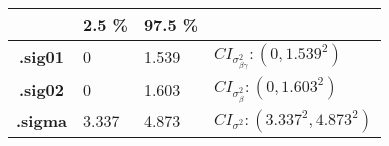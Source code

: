 \documentclass[12pt,]{article}
\begin{document}
\begin{longtable}[]{@{}clll@{}}
\toprule
\begin{minipage}[b]{0.21\columnwidth}\centering
~\strut
\end{minipage} & \begin{minipage}[b]{0.10\columnwidth}\raggedright
2.5 \%\strut
\end{minipage} & \begin{minipage}[b]{0.09\columnwidth}\raggedright
97.5 \%\strut
\end{minipage} & \begin{minipage}[b]{0.48\columnwidth}\raggedright
\strut
\end{minipage}\tabularnewline
\midrule
\endhead
\begin{minipage}[t]{0.21\columnwidth}\centering
\textbf{.sig01}\strut
\end{minipage} & \begin{minipage}[t]{0.10\columnwidth}\raggedright
0\strut
\end{minipage} & \begin{minipage}[t]{0.09\columnwidth}\raggedright
1.539\strut
\end{minipage} & \begin{minipage}[t]{0.48\columnwidth}\raggedright
\(CI_{\sigma^2_{\beta\gamma}}:(0,1.539^2)\)\strut
\end{minipage}\tabularnewline
\begin{minipage}[t]{0.21\columnwidth}\centering
\textbf{.sig02}\strut
\end{minipage} & \begin{minipage}[t]{0.10\columnwidth}\raggedright
0\strut
\end{minipage} & \begin{minipage}[t]{0.09\columnwidth}\raggedright
1.603\strut
\end{minipage} & \begin{minipage}[t]{0.48\columnwidth}\raggedright
\(CI_{\sigma^2_{\beta}}:(0,1.603^2)\)\strut
\end{minipage}\tabularnewline
\begin{minipage}[t]{0.21\columnwidth}\centering
\textbf{.sigma}\strut
\end{minipage} & \begin{minipage}[t]{0.10\columnwidth}\raggedright
3.337\strut
\end{minipage} & \begin{minipage}[t]{0.09\columnwidth}\raggedright
4.873\strut
\end{minipage} & \begin{minipage}[t]{0.48\columnwidth}\raggedright
\(CI_{\sigma^2}:(3.337^2,4.873^2)\)\strut
\end{minipage}\tabularnewline
\bottomrule
\end{longtable}
\end{document}
